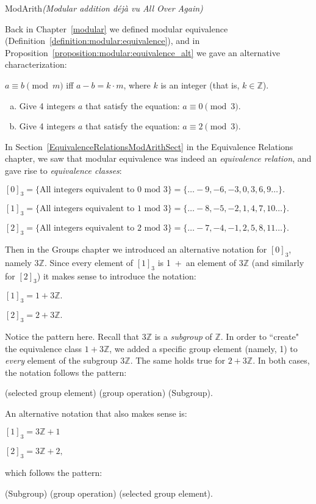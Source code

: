 \begin{example}{ModArith}\emph{(Modular addition d\'ej\`a vu All Over Again)}  

Back in Chapter~\ref{modular} we defined modular equivalence (Definition~\ref{definition:modular:equivalence}), and in Proposition~\ref{proposition:modular:equivalence_alt} we gave an alternative characterization:
\medskip

$a \equiv b \pmod{m}$ iff $a - b = k \cdot m$, where $k$ is an integer (that is, $k \in  {\mathbb Z}$). 
\medskip

\begin{exercise}{}
\begin{enumerate}[(a)]
\item
Give 4 integers $a$ that satisfy the equation: $a \equiv 0 \pmod{3}$.
\item
Give 4 integers $a$ that satisfy the equation: $a \equiv 2 \pmod{3}$.
\end{enumerate}
\end{exercise}

\noindent
In Section~\ref{EquivalenceRelationsModArithSect} in the Equivalence Relations chapter, we saw that modular equivalence was indeed an \emph{equivalence relation}, and  gave rise to \emph{equivalence classes}:
\medskip

$[0]_3  = \{\mbox{All integers equivalent to 0 mod 3}\} = \{ \ldots -9, -6, -3, 0, 3, 6, 9 \ldots \}.$

$[1]_3  = \{\mbox{All integers equivalent to 1 mod 3}\} = \{ \ldots -8, -5, -2, 1, 4, 7, 10 \ldots \}.$

$[2]_3  = \{\mbox{All integers equivalent to 2 mod 3}\} = \{ \ldots -7, -4, -1, 2, 5, 8, 11 \ldots \}.$
\medskip

\noindent
Then in the Groups chapter we introduced an alternative notation for $[0]_3$, namely $3{\mathbb Z}$. Since every element of  $[1]_3$ is 1~+~an element of $3{\mathbb Z}$ (and similarly for $[2]_3$)  it makes sense to introduce the notation:
\medskip

$[1]_3  = 1 + 3{\mathbb Z}.$

$[2]_3  = 2 + 3{\mathbb Z}.$
\medskip

\noindent
Notice the pattern here. Recall that $3{\mathbb Z}$ is a \emph{subgroup} of ${\mathbb Z}$. In order to ``create" the equivalence class $1 + 3{\mathbb Z}$, we added a specific group element (namely, 1) to \emph{every} element of the subgroup $3{\mathbb Z}$. The same holds true for $2 +  3{\mathbb Z}$. In both cases, the notation follows the pattern: 
\medskip

(selected group element) (group operation) (Subgroup). 
\medskip

\noindent
An alternative notation that also makes sense is:
\medskip

$[1]_3  =  3{\mathbb Z} + 1$

$[2]_3  = 3{\mathbb Z} + 2,$
\medskip

\noindent
which follows the pattern:
\medskip

(Subgroup) (group operation) (selected group element).
\end{example}


